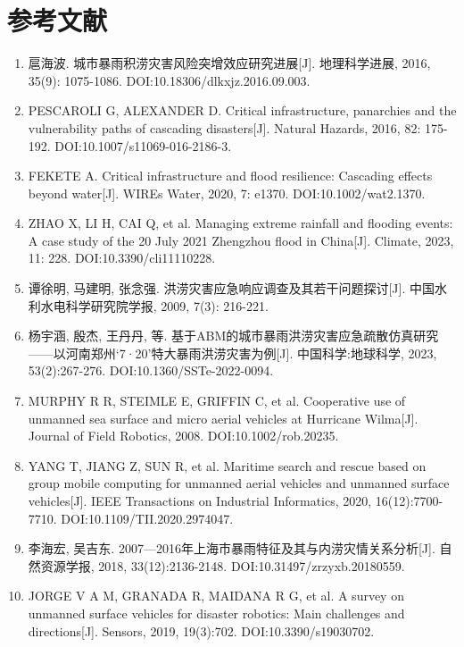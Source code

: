 \documentclass[UTF8,a4paper,zihao=-4]{ctexart}
\begin{document}
\section*{参考文献}\begin{enumerate}

\item 扈海波. 城市暴雨积涝灾害风险突增效应研究进展[J]. 地理科学进展, 2016, 35(9): 1075-1086. DOI:10.18306/dlkxjz.2016.09.003.

\item PESCAROLI G, ALEXANDER D. Critical infrastructure, panarchies and the vulnerability paths of cascading disasters[J]. Natural Hazards, 2016, 82: 175-192. DOI:10.1007/s11069-016-2186-3.

\item FEKETE A. Critical infrastructure and flood resilience: Cascading effects beyond water[J]. WIREs Water, 2020, 7: e1370. DOI:10.1002/wat2.1370.

\item ZHAO X, LI H, CAI Q, et al. Managing extreme rainfall and flooding events: A case study of the 20 July 2021 Zhengzhou flood in China[J]. Climate, 2023, 11: 228. DOI:10.3390/cli11110228.

\item 谭徐明, 马建明, 张念强. 洪涝灾害应急响应调查及其若干问题探讨[J]. 中国水利水电科学研究院学报, 2009, 7(3): 216-221.

\item 杨宇涵, 殷杰, 王丹丹, 等. 基于ABM的城市暴雨洪涝灾害应急疏散仿真研究——以河南郑州‘7·20’特大暴雨洪涝灾害为例[J]. 中国科学:地球科学, 2023, 53(2):267-276. DOI:10.1360/SSTe-2022-0094.

\item MURPHY R R, STEIMLE E, GRIFFIN C, et al. Cooperative use of unmanned sea surface and micro aerial vehicles at Hurricane Wilma[J]. Journal of Field Robotics, 2008. DOI:10.1002/rob.20235.

\item YANG T, JIANG Z, SUN R, et al. Maritime search and rescue based on group mobile computing for unmanned aerial vehicles and unmanned surface vehicles[J]. IEEE Transactions on Industrial Informatics, 2020, 16(12):7700-7710. DOI:10.1109/TII.2020.2974047.

\item 李海宏, 吴吉东. 2007—2016年上海市暴雨特征及其与内涝灾情关系分析[J]. 自然资源学报, 2018, 33(12):2136-2148. DOI:10.31497/zrzyxb.20180559.

\item JORGE V A M, GRANADA R, MAIDANA R G, et al. A survey on unmanned surface vehicles for disaster robotics: Main challenges and directions[J]. Sensors, 2019, 19(3):702. DOI:10.3390/s19030702.


\end{enumerate}
\end{document}
